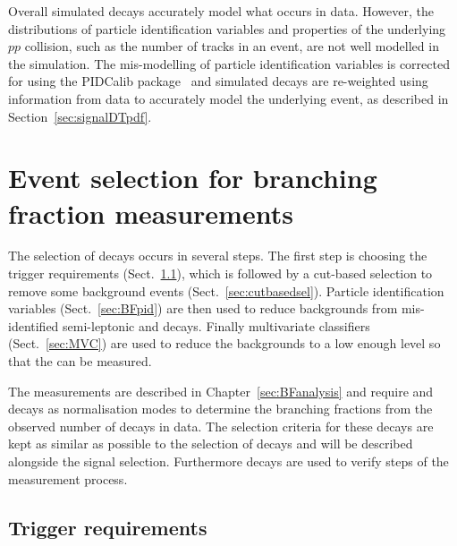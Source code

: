 Overall simulated decays accurately model what occurs in data. However, the distributions of particle identification variables and properties of the underlying $pp$ collision, such as the number of tracks in an event, are not well modelled in the simulation. %
The mis-modelling of particle identification variables is corrected for using the PIDCalib package~\cite{Anderlini:2202412} and simulated decays are re-weighted using information from data to accurately model the underlying event, as described in Section~\ref{sec:signalDTpdf}. 


\section{Event selection for branching fraction measurements}
\label{sec:BFsel}
The selection of \bmumu decays occurs in several steps. The first step is choosing the trigger requirements (Sect.~\ref{sec:BFtrigger}), which is followed by a cut-based selection to remove some background events (Sect.~\ref{sec:cutbasedsel}). Particle identification variables (Sect.~\ref{sec:BFpid}) are then used to reduce backgrounds from mis-identified semi-leptonic and \bhh decays. Finally multivariate classifiers (Sect.~\ref{sec:MVC}) are used to reduce the backgrounds to a low enough level so that the \bmumu \BFs can be measured.%

The \BF measurements are described in Chapter~\ref{sec:BFanalysis} and require \bujpsik and \bhh decays as normalisation modes to determine the branching fractions from the observed number of \bmumu decays in data. The selection criteria for these decays are kept as similar as possible to the selection of \bmumu decays and will be described alongside the signal selection. Furthermore \bsjpsiphi decays are used to verify steps of the measurement process. %


\subsection{Trigger requirements}
\label{sec:BFtrigger}

